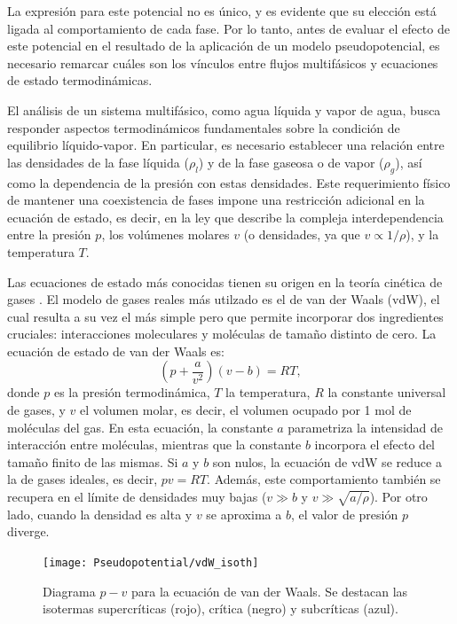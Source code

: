La expresi\'on para este potencial no es \'unico, y es evidente que su elecci\'on est\'a ligada al comportamiento de cada fase. Por lo tanto, antes de evaluar el efecto de este potencial en el resultado de la aplicaci\'on de un modelo pseudopotencial, es necesario remarcar cu\'ales son los v\'inculos entre flujos multif\'asicos y ecuaciones de estado termodin\'amicas.

El an\'alisis de un sistema multif\'asico, como agua l\'iquida y vapor de agua, busca responder aspectos termodin\'amicos fundamentales sobre la condici\'on de equilibrio l\'iquido-vapor. En particular, es necesario establecer una relaci\'on entre las densidades de la fase l\'iquida ($\rho_l$) y de la fase gaseosa o de vapor ($\rho_g$), as\'i como la dependencia de la presi\'on con estas densidades. Este requerimiento f\'isico de mantener una coexistencia de fases impone una restricci\'on adicional en la ecuaci\'on de estado, es decir, en la ley que describe la compleja interdependencia entre la presi\'on $p$, los vol\'umenes molares $v$ (o densidades, ya que $v \propto 1/\rho$), y la temperatura $T$. 

Las ecuaciones de estado m\'as conocidas tienen su origen en la teor\'ia cin\'etica de gases \cite{blundell_concepts_2006}. El modelo de gases reales m\'as utilzado es el de van der Waals (vdW), el cual resulta a su vez el m\'as simple pero que permite incorporar dos ingredientes cruciales: interacciones moleculares y mol\'eculas de tama\~no distinto de cero. La ecuaci\'on de estado de van der Waals es:
\begin{equation}
	\left( p + \dfrac{a}{v^2} \right) \left( v-b \right) = RT,
\end{equation}
donde $p$ es la presi\'on termodin\'amica, $T$ la temperatura, $R$ la constante universal de gases, y $v$ el volumen molar, es decir, el volumen ocupado por 1 mol de mol\'eculas del gas. En esta ecuaci\'on, la constante $a$ parametriza la intensidad de interacci\'on entre mol\'eculas, mientras que la constante $b$ incorpora el efecto del tama\~no finito de las mismas. Si $a$ y $b$ son nulos, la ecuaci\'on de vdW se reduce a la de gases ideales, es decir, $pv = RT$. Adem\'as, este comportamiento tambi\'en se recupera en el l\'imite de densidades muy bajas ($v \gg b$ y $v \gg \sqrt{a/\rho}$). Por otro lado, cuando la densidad es alta y $v$ se aproxima a $b$, el valor de presi\'on $p$ diverge.

\begin{figure}[ht]
	\centering
	\texttt{[image: Pseudopotential/vdW\_isoth]}
	\caption{Diagrama $p-v$ para la ecuaci\'on de van der Waals. Se destacan las isotermas supercr\'iticas (rojo), cr\'itica (negro) y subcr\'iticas (azul).}
	\label{fig:vdW_isoth}
\end{figure}

